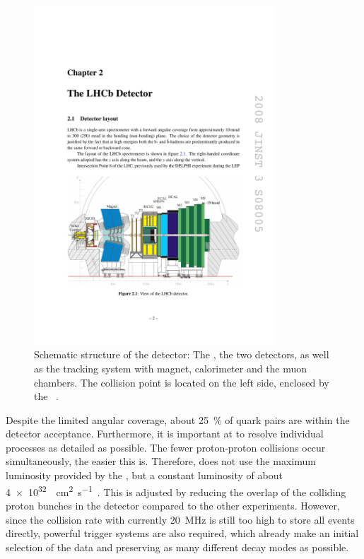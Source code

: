 \begin{figure}[tbp]
    \centering
    \includegraphics[width=0.8\textwidth]{05lhcb/figs/detector.pdf}
    \caption{Schematic structure of the \lhcb detector: The \velo, the two \rich detectors, as well as the tracking system with magnet, calorimeter and the muon chambers.
    The collision point is located on the left side, enclosed by the \velo~\cite{Alves:2008zz}.}
    \label{fig:lhcbdetector}
\end{figure}
Despite the limited angular coverage, about \SI{25}{\percent} of \bbbar quark pairs are within the detector acceptance.
Furthermore, it is important at \lhcb to resolve individual processes as detailed as possible.
The fewer proton-proton collisions occur simultaneously, the easier this is.
Therefore, \lhcb does not use the maximum luminosity provided by the \lhc, but a constant luminosity of about \SI{4e32}{\per\cm\squared\per\second}~\cite{LHC_statistic}.
This is adjusted by reducing the overlap of the colliding proton bunches in the \lhcb detector compared to the other experiments.
However, since the collision rate with currently \SI{20}{\mega\hertz} is still too high to store all events directly, powerful trigger systems are also required, which already make an initial selection of the data and preserving as many different decay modes as possible.

